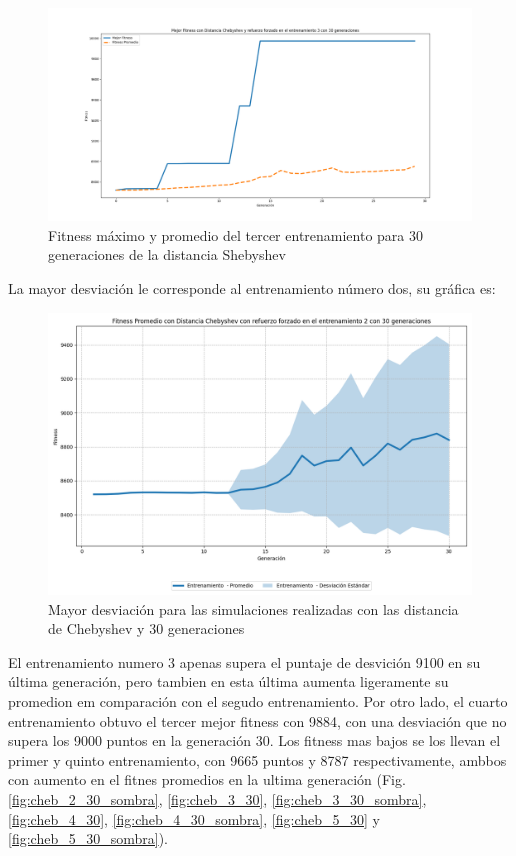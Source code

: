 \documentclass[conference]{IEEEtran}
\begin{document}
\begin{figure}[H]
    \centering
    \includegraphics[width=0.99\linewidth]{Chebyshev/Fitness_Individual_30Gen/Fitness_3_Cheby_30Gen.png}
    \caption{Fitness máximo y promedio del tercer entrenamiento para 30 generaciones de la distancia Shebyshev}
    \label{fig:en:she_3}
\end{figure}
La mayor desviación le corresponde al entrenamiento número dos, su gráfica es:
\begin{figure}[H]
    \centering
    \includegraphics[width=0.99\linewidth]{Chebyshev/Fitness_Individual_30Gen/Fitness_2_Cheby_30Gen_Sombra.png}
    \caption{Mayor desviación para las simulaciones realizadas con las distancia de Chebyshev y 30 generaciones}
    \label{fig:enter-label}
\end{figure}

El entrenamiento numero 3 apenas supera el puntaje de desvición 9100 en su última generación, pero tambien en esta última aumenta ligeramente su promedion em comparación con el segudo entrenamiento. Por otro lado, el cuarto entrenamiento obtuvo el tercer mejor fitness con 9884, con una desviación que no supera los 9000 puntos en la generación 30. Los fitness mas bajos se los llevan el primer y quinto entrenamiento, con 9665 puntos y 8787 respectivamente, ambbos con aumento en el fitnes promedios en la ultima generación (Fig. \ref{fig:cheb_2_30_sombra}, \ref{fig:cheb_3_30},  \ref{fig:cheb_3_30_sombra}, \ref{fig:cheb_4_30}, \ref{fig:cheb_4_30_sombra}, \ref{fig:cheb_5_30} y \ref{fig:cheb_5_30_sombra}).
\end{document}
